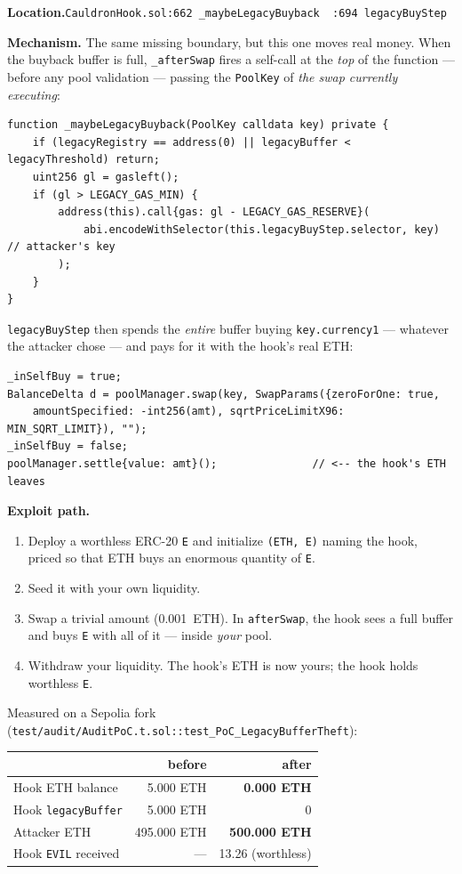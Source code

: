 \documentclass[10pt,a4paper]{article}
\newcommand{\loc}[1]{%
  \smallskip\noindent
  {\raggedright\textbf{Location.}\quad\texttt{\small #1}\par}\smallskip}
\newcommand{\code}[1]{\texttt{\small #1}}
\begin{document}
\loc{CauldronHook.sol:662 \texttt{\_maybeLegacyBuyback} \textbullet\ :694 \texttt{legacyBuyStep}}

\textbf{Mechanism.} The same missing boundary, but this one moves real money.
When the buyback buffer is full, \code{\_afterSwap} fires a self-call at the
\emph{top} of the function --- before any pool validation --- passing the
\code{PoolKey} of \emph{the swap currently executing}:

\begin{lstlisting}[firstnumber=662]
function _maybeLegacyBuyback(PoolKey calldata key) private {
    if (legacyRegistry == address(0) || legacyBuffer < legacyThreshold) return;
    uint256 gl = gasleft();
    if (gl > LEGACY_GAS_MIN) {
        address(this).call{gas: gl - LEGACY_GAS_RESERVE}(
            abi.encodeWithSelector(this.legacyBuyStep.selector, key)   // attacker's key
        );
    }
}
\end{lstlisting}

\noindent \code{legacyBuyStep} then spends the \emph{entire} buffer buying
\code{key.currency1} --- whatever the attacker chose --- and pays for it with
the hook's real ETH:

\begin{lstlisting}[firstnumber=700]
_inSelfBuy = true;
BalanceDelta d = poolManager.swap(key, SwapParams({zeroForOne: true,
    amountSpecified: -int256(amt), sqrtPriceLimitX96: MIN_SQRT_LIMIT}), "");
_inSelfBuy = false;
poolManager.settle{value: amt}();               // <-- the hook's ETH leaves
\end{lstlisting}

\textbf{Exploit path.}
\begin{enumerate}
\item Deploy a worthless ERC-20 \code{E} and initialize \code{(ETH, E)} naming
the hook, priced so that ETH buys an enormous quantity of \code{E}.
\item Seed it with your own liquidity.
\item Swap a trivial amount (0.001~ETH). In \code{afterSwap}, the hook sees a
full buffer and buys \code{E} with all of it --- inside \emph{your} pool.
\item Withdraw your liquidity. The hook's ETH is now yours; the hook holds
worthless \code{E}.
\end{enumerate}

\noindent Measured on a Sepolia fork
(\code{test/audit/AuditPoC.t.sol::test\_PoC\_LegacyBufferTheft}):

\begin{center}\small
\begin{tabular}{@{}lrr@{}}
\toprule
& \textbf{before} & \textbf{after} \\
\midrule
Hook ETH balance    & 5.000 ETH & \textbf{0.000 ETH} \\
Hook \code{legacyBuffer} & 5.000 ETH & 0 \\
Attacker ETH        & 495.000 ETH & \textbf{500.000 ETH} \\
Hook \code{EVIL} received & --- & 13.26 (worthless) \\
\bottomrule
\end{tabular}
\end{center}
\end{document}
